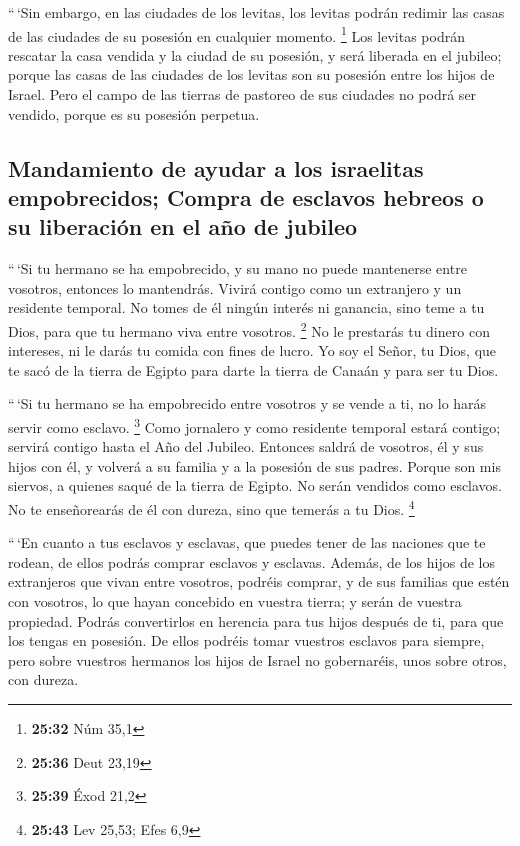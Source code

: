 \begin{paracol}{2}
 ``\,`Sin embargo, en las ciudades de los levitas, los
levitas podrán redimir las casas de las ciudades de su posesión en
cualquier momento. \footnote{\textbf{25:32} Núm 35,1} 
Los levitas podrán rescatar la casa vendida y la ciudad de su posesión,
y será liberada en el jubileo; porque las casas de las ciudades de los
levitas son su posesión entre los hijos de Israel.  Pero
el campo de las tierras de pastoreo de sus ciudades no podrá ser
vendido, porque es su posesión perpetua.

\hypertarget{mandamiento-de-ayudar-a-los-israelitas-empobrecidos-compra-de-esclavos-hebreos-o-su-liberaciuxf3n-en-el-auxf1o-de-jubileo}{%
\subsection{Mandamiento de ayudar a los israelitas empobrecidos; Compra
de esclavos hebreos o su liberación en el año de
jubileo}\label{mandamiento-de-ayudar-a-los-israelitas-empobrecidos-compra-de-esclavos-hebreos-o-su-liberaciuxf3n-en-el-auxf1o-de-jubileo}}

 ``\,`Si tu hermano se ha empobrecido, y su mano no puede
mantenerse entre vosotros, entonces lo mantendrás. Vivirá contigo como
un extranjero y un residente temporal.  No tomes de él
ningún interés ni ganancia, sino teme a tu Dios, para que tu hermano
viva entre vosotros. \footnote{\textbf{25:36} Deut 23,19}
 No le prestarás tu dinero con intereses, ni le darás tu
comida con fines de lucro.  Yo soy el Señor, tu Dios, que
te sacó de la tierra de Egipto para darte la tierra de Canaán y para ser
tu Dios.

 ``\,`Si tu hermano se ha empobrecido entre vosotros y se
vende a ti, no lo harás servir como esclavo. \footnote{\textbf{25:39}
  Éxod 21,2}  Como jornalero y como residente temporal
estará contigo; servirá contigo hasta el Año del Jubileo.
 Entonces saldrá de vosotros, él y sus hijos con él, y
volverá a su familia y a la posesión de sus padres. 
Porque son mis siervos, a quienes saqué de la tierra de Egipto. No serán
vendidos como esclavos.  No te enseñorearás de él con
dureza, sino que temerás a tu Dios. \footnote{\textbf{25:43} Lev 25,53;
  Efes 6,9}

 ``\,`En cuanto a tus esclavos y esclavas, que puedes
tener de las naciones que te rodean, de ellos podrás comprar esclavos y
esclavas.  Además, de los hijos de los extranjeros que
vivan entre vosotros, podréis comprar, y de sus familias que estén con
vosotros, lo que hayan concebido en vuestra tierra; y serán de vuestra
propiedad.  Podrás convertirlos en herencia para tus
hijos después de ti, para que los tengas en posesión. De ellos podréis
tomar vuestros esclavos para siempre, pero sobre vuestros hermanos los
hijos de Israel no gobernaréis, unos sobre otros, con dureza.


\end{paracol}
